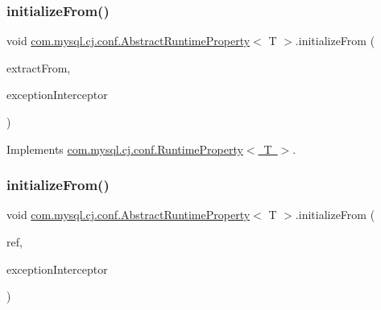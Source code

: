 \mbox{\label{classcom_1_1mysql_1_1cj_1_1conf_1_1_abstract_runtime_property_aa821d8b742dfb3c658972f11f57ad02c}} 
\subsubsection{\texorpdfstring{initialize\+From()}{initializeFrom()}\hspace{0.1cm}{\footnotesize\ttfamily [1/3]}}
{\footnotesize\ttfamily void \mbox{\hyperlink{classcom_1_1mysql_1_1cj_1_1conf_1_1_abstract_runtime_property}{com.\+mysql.\+cj.\+conf.\+Abstract\+Runtime\+Property}}$<$ T $>$.initialize\+From (\begin{DoxyParamCaption}\item[{Properties}]{extract\+From,  }\item[{\mbox{\hyperlink{interfacecom_1_1mysql_1_1cj_1_1exceptions_1_1_exception_interceptor}{Exception\+Interceptor}}}]{exception\+Interceptor }\end{DoxyParamCaption})}



Implements \mbox{\hyperlink{interfacecom_1_1mysql_1_1cj_1_1conf_1_1_runtime_property_a0ab00125bf110114bb1608e51167b4fd}{com.\+mysql.\+cj.\+conf.\+Runtime\+Property$<$ T $>$}}.

\mbox{\label{classcom_1_1mysql_1_1cj_1_1conf_1_1_abstract_runtime_property_ad1d2dcce52a6e6284cebb20fbf9729db}} 
\subsubsection{\texorpdfstring{initialize\+From()}{initializeFrom()}\hspace{0.1cm}{\footnotesize\ttfamily [2/3]}}
{\footnotesize\ttfamily void \mbox{\hyperlink{classcom_1_1mysql_1_1cj_1_1conf_1_1_abstract_runtime_property}{com.\+mysql.\+cj.\+conf.\+Abstract\+Runtime\+Property}}$<$ T $>$.initialize\+From (\begin{DoxyParamCaption}\item[{Reference}]{ref,  }\item[{\mbox{\hyperlink{interfacecom_1_1mysql_1_1cj_1_1exceptions_1_1_exception_interceptor}{Exception\+Interceptor}}}]{exception\+Interceptor }\end{DoxyParamCaption})}



